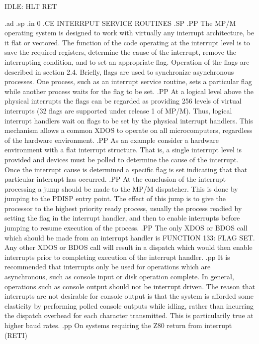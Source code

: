 	            IDLE:
	                    HLT
	                    RET

.ad
.sp
.in 0
.CE
INTERRPUT SERVICE ROUTINES
.SP
.PP
The MP/M operating system is designed to work with virtually any
interrupt architecture, be it flat or vectored.  The function of the
code operating at the interrupt level is to save the
required registers,
determine the cause of the interrupt,
remove the interrupting condition, and to set an appropriate flag.
Operation of the flags are described in section 2.4.
Briefly, flags are used to synchronize asynchronous processes.  One
process, such as an interrupt service routine, sets a particular flag
while another process waits for the flag to be set.
.PP
At a logical level above the physical interrupts the flags can be
regarded as providing 256 levels of virtual interrupts
(32 flags are supported under release 1 of MP/M).
Thus, logical interrupt handlers wait
on flags to be set by the physical interrupt handlers.
This mechanism allows a common XDOS to operate on all microcomputers,
regardless of the hardware environment.
.PP
As an example consider a hardware environment with
a flat interrupt structure.  That is, a single interrupt level is
provided and devices must be polled to determine the cause of the
interrupt.  Once the interrupt cause is determined a specific flag
is set indicating that that particular interrupt has occurred.
.PP
At the conclusion of the interrupt processing a jump should be made
to the MP/M dispatcher.  This is done by jumping to the PDISP entry
point.  The effect of this jump is to give the processor to the highest
priority ready process, usually the process readied by setting the
flag in the interrupt handler, and then to enable interrupts before
jumping to resume execution of the process.
.PP
The  only  XDOS or BDOS call which should be made  from  an
interrupt  handler  is FUNCTION 133: FLAG SET.  Any  other
XDOS  or  BDOS call will result in a dispatch  which  would
then enable interrupts prior to completing execution of the
interrupt handler.
.pp
It  is  recommended  that  interrupts  only  be  used   for
operations which are asynchronous, such as console input or
disk  operation complete.  In general, operations such as
console output should not be interrupt driven.  The reason
that  interrupts  are not desirable for console  output  is
that  the system is afforded some elasticity by  performing
polled console outputs while idling, rather than incurring
the dispatch overhead for each character transmitted.  This
is particularily true at higher baud rates.
.pp
On  systems requiring the Z80 return from interrupt  (RETI)
